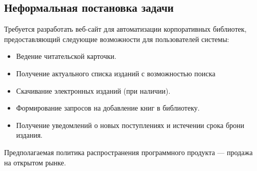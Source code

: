 \documentclass[./intro.tex]{subfiles}
\begin{document}
\subsection{Неформальная постановка задачи}
\par
Требуется разработать веб-сайт для автоматизации корпоративных библиотек, предоставляющий следующие возможности для пользователей системы:
\begin{itemize}
    \item Ведение читательской карточки.
    \item Получение актуального списка изданий с возможностью поиска
    \item Скачивание электронных изданий (при наличии).
    \item Формирование запросов на добавление книг в библиотеку.
    \item Получение уведомлений о новых поступлениях и истечении срока брони издания.
\end{itemize}
\par
Предполагаемая политика распространения программного продукта --- продажа на открытом рынке.
\end{document}

